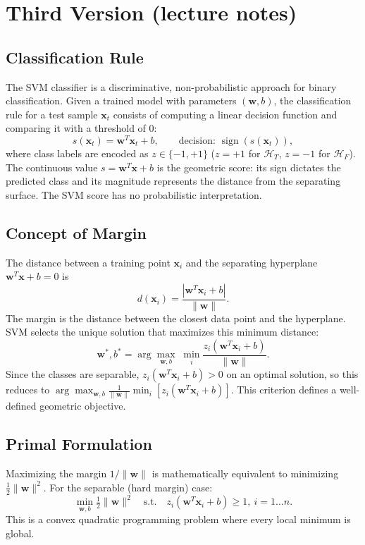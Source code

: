 \newpage
\section*{Third Version (lecture notes)}

\subsection*{Classification Rule}

The SVM classifier is a discriminative, non-probabilistic approach for binary classification. Given a trained model with parameters $(\mathbf{w}, b)$, the classification rule for a test sample $\mathbf{x}_t$ consists of computing a linear decision function and comparing it with a threshold of $0$:
\[
s(\mathbf{x}_t) = \mathbf{w}^T\mathbf{x}_t + b, \qquad \text{decision: } \operatorname{sign}(s(\mathbf{x}_t)),
\]
where class labels are encoded as $z\in\{-1,+1\}$ ($z=+1$ for $\mathcal{H}_T$, $z=-1$ for $\mathcal{H}_F$). The continuous value $s=\mathbf{w}^T\mathbf{x}+b$ is the geometric score: its sign dictates the predicted class and its magnitude represents the distance from the separating surface. The SVM score has no probabilistic interpretation.

\subsection*{Concept of Margin}

The distance between a training point $\mathbf{x}_i$ and the separating hyperplane $\mathbf{w}^T\mathbf{x}+b=0$ is
\[
d(\mathbf{x}_i) = \frac{|\mathbf{w}^T\mathbf{x}_i+b|}{\|\mathbf{w}\|}.
\]
The margin is the distance between the closest data point and the hyperplane. SVM selects the unique solution that maximizes this minimum distance:
\[
\mathbf{w}^*,b^* = \arg\max_{\mathbf{w},b}\;\min_i \frac{z_i(\mathbf{w}^T\mathbf{x}_i+b)}{\|\mathbf{w}\|}.
\]
Since the classes are separable, $z_i(\mathbf{w}^T\mathbf{x}_i+b)>0$ on an optimal solution, so this reduces to $\arg\max_{\mathbf{w},b}\frac{1}{\|\mathbf{w}\|}\min_i[z_i(\mathbf{w}^T\mathbf{x}_i+b)]$. This criterion defines a well-defined geometric objective.

\subsection*{Primal Formulation}

Maximizing the margin $1/\|\mathbf{w}\|$ is mathematically equivalent to minimizing $\frac{1}{2}\|\mathbf{w}\|^2$. For the separable (hard margin) case:
\[
\min_{\mathbf{w},b}\tfrac{1}{2}\|\mathbf{w}\|^2 \quad \text{s.t.} \quad z_i(\mathbf{w}^T\mathbf{x}_i+b)\ge1,\ i=1\ldots n.
\]
This is a convex quadratic programming problem where every local minimum is global.

